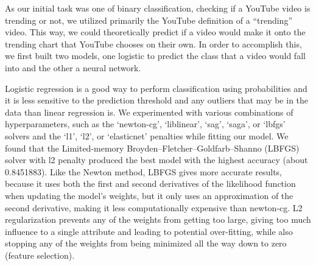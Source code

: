 \documentclass{article}
\begin{document}
\quad As our initial task was one of binary classification, checking if a YouTube video is trending or not, we utilized primarily the YouTube definition of a “trending” video. This way, we could theoretically predict if a video would make it onto the trending chart that YouTube chooses on their own. In order to accomplish this, we first built two models, one logistic to predict the class that a video would fall into and the other a neural network.
\par Logistic regression is a good way to perform classification using probabilities and it is less sensitive to the prediction threshold and any outliers that may be in the data than linear regression is. We experimented with various combinations of hyperparameters, such as the ‘newton-cg’, ‘liblinear’, ‘sag’, ‘saga’, or ‘lbfgs’ solvers and the ‘l1’, ‘l2’, or ‘elasticnet’ penalties while fitting our model.  We found that the Limited-memory Broyden–Fletcher–Goldfarb–Shanno (LBFGS) solver with l2 penalty produced the best model with the highest accuracy (about 0.8451883).  Like the Newton method, LBFGS gives more accurate results, because it uses both the first and second derivatives of the likelihood function when updating the model’s weights, but it only uses an approximation of the second derivative, making it less computationally expensive than newton-cg.  L2 regularization prevents any of the weights from getting too large, giving too much influence to a single attribute and leading to potential over-fitting, while also stopping any of the weights from being minimized all the way down to zero (feature selection).
\end{document}
